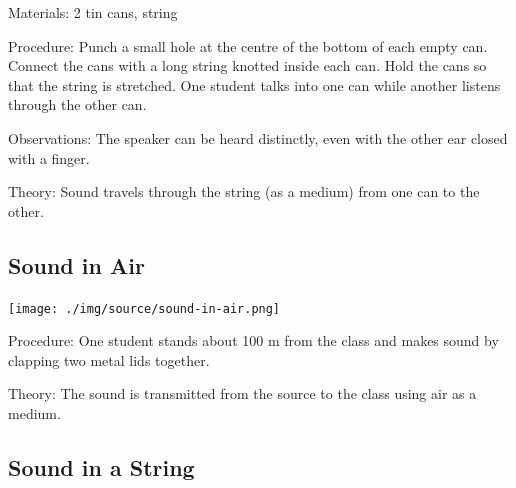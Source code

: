 \begin{multicols}{2}
\begin{description*}
\item[Materials:]{2 tin cans, string}
\item[Procedure:]{Punch a small hole at the centre of the bottom of each empty can. Connect the cans with a long string knotted inside each can. Hold the cans so that the string is stretched. One student talks into one can while another listens through the other can.}
\item[Observations:]{The speaker can be heard distinctly, even with the other ear closed with a finger.}
\item[Theory:]{Sound travels through the string (as a medium) from one can to the other.}
\end{description*}

\subsection{Sound in Air}

\begin{center}
\texttt{[image: ./img/source/sound-in-air.png]}
\end{center}

\begin{description*}
\item[Procedure:]{One student stands about 100 m from the class and makes sound by clapping two metal lids together.}
\item[Theory:]{The sound is transmitted from the source to the class using air as a medium.}
\end{description*}

\subsection{Sound in a String}


\end{multicols}
